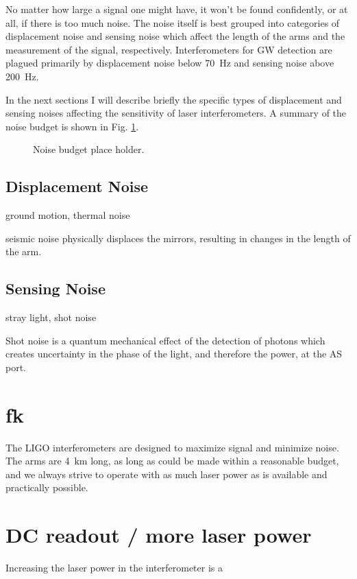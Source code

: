 No matter how large a signal one might have, it won't be found
confidently, or at all, if there is too much noise. The noise itself
is best grouped into categories of displacement noise and sensing
noise which affect the length of the arms and the measurement of the
signal, respectively. Interferometers for GW detection are plagued
primarily by displacement noise below 70~Hz and sensing noise above
200~Hz.

In the next sections I will describe briefly the specific types of
displacement and sensing noises affecting the sensitivity of laser
interferometers. A summary of the noise budget is shown in
Fig. \ref{fig:NB}. 


\begin{figure}
\begin{centering}
\caption[LIGO noise budget]{Noise budget place holder.}
\label{fig:NB}
\end{centering}
\end{figure}


\subsection{Displacement Noise} 
ground motion, thermal noise

seismic noise physically displaces the mirrors, resulting in changes in the length
of the arm. 

\subsection{Sensing Noise}
stray light, shot noise

Shot noise is a quantum mechanical effect of the detection
of photons which creates uncertainty in the phase of the light, and
therefore the power, at the AS port.



\section{fk}
The LIGO interferometers are designed to maximize signal and minimize
noise. The arms are 4~km long, as long as could be made within a
reasonable budget, and we always strive to operate with as much laser
power as is available and practically possible. 


\section{DC readout / more laser power}
Increasing the laser power in the interferometer is a 

